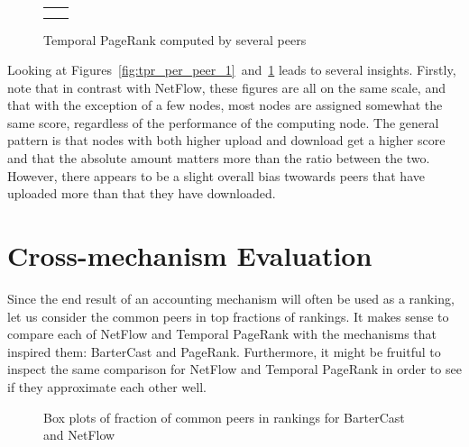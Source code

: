 \documentclass[a4paper,11pt]{book}
\theoremstyle{definition}
\begin{document}
\begin{figure}[ht]
    \centering
    \begin{tabular}[ht]{cc}
         & 

         \\ 
         &
         \\

    \end{tabular}
    \caption{Temporal PageRank computed by several peers}
    \label{fig:tpr_per_peer_2}
\end{figure}


Looking at Figures~\ref{fig:tpr_per_peer_1}~and~\ref{fig:tpr_per_peer_2} leads to several insights. Firstly, note that
in contrast with NetFlow, these figures are all on the same scale, and that with the
exception of a few nodes, most nodes are assigned somewhat the same score, regardless
of the performance of the computing node. The general pattern is that nodes with both
higher upload and download get a higher score and that the absolute amount matters more
than the ratio between the two. However, there appears to be a slight overall bias
twowards peers that have uploaded more than that they have downloaded.

\section{Cross-mechanism Evaluation}

Since the end result of an accounting mechanism will often be used as a ranking, let us
consider the common peers in top fractions of rankings. It makes sense to compare each
of NetFlow and Temporal PageRank with the mechanisms that inspired them: BarterCast
and PageRank. Furthermore, it might be fruitful to inspect the same comparison for
NetFlow and Temporal PageRank in order to see if they approximate each other well.

\begin{figure}[ht]
    \centering
    
    \caption{Box plots of fraction of common peers in rankings for BarterCast and NetFlow}
    \label{fig:box_bc_netflow}
\end{figure}
\end{document}
